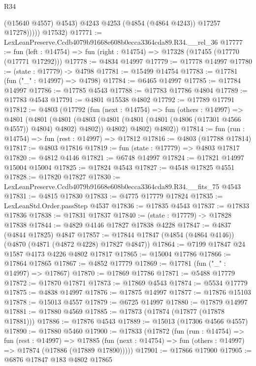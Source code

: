 \begin{lexlean}{R34}
\begin{coremodule}
                  (@15640 @4557)
                  @4543)
                @4243
                @4253
                (@4854 (@4864 @4243))
                @17257
                @17278)))))
      @17532)
@17771 := LexLeanPreserve.Ccdb4079b91668e608b0ecca3364cda89.R34.__rel_36
@17777 := fun (left : @14754) => fun (right : @14754) => @17328 (@17455 (@17770 (@17771 @17292)))
@17778 := @4834 @14997
@17779 := @17778 @14997
@17780 := (state : @17779) -> @4798
@17781 := @15499 @14754
@17783 := @17781 (fun ("_" : @14997) => @4798)
@17784 := @6465 @14997
@17785 := @17784 @14997
@17786 := @17785 @4543
@17788 := @17783 @17786 @4804
@17789 := @17783 @4543
@17791 := @4801 @15538 @4802
@17792 := @17789 @17791
@17812 := @4803
    (@17792
      (fun (next : @14754) =>
      fun (others : @14997) =>
      @4801
        (@4801
          (@4801
            (@4803 (@4801 (@4801 (@4801 (@4806 (@17301 @4566 @4557)) @4804) @4802) @4802))
            @4802)
          @4802)
        @4802))
@17814 := fun (run : @14754) => fun (rest : @14997) => @17812
@17816 := @4803 (@17788 @17814)
@17817 := @4803 @17816
@17819 := fun (state : @17779) => @4803 @17817
@17820 := @4812 @4146
@17821 := @6748 @14997
@17824 := @17821 @14997 @15004 @15004
@17825 := @17824 @4543
@17827 := @4548 @17825 @4551
@17828 := @17820 @17827
@17830 := LexLeanPreserve.Ccdb4079b91668e608b0ecca3364cda89.R34.__fits_75 @4543
@17831 := @4815 @17830
@17833 := @4775 @17779 @17824
@17835 := LexLeanStd.Order.passStep @4537
@17836 := @17835 @4543
@17837 := @17833 @17836
@17838 := @17831 @17837
@17840 := (state : @17779) -> @17828 @17838
@17844 := @4829 @4146 @17827 @17838 @4228
@17847 := @4837 (@4844 @17825) @4847
@17857 := @17844 @17847 (@4854 (@4864 @4146)) (@4870 (@4871 (@4872 @4228) @17827 @4847))
@17864 := @7199 @17847 @24 @1587 @4173 @4226 @4802 @17817
@17865 := @15004 @17786
@17866 := @17864 @17865
@17867 := @4852 @17779
@17869 := @17781 (fun ("_" : @14997) => @17867)
@17870 := @17869 @17786
@17871 := @5488 @17779
@17872 := @17870 @17871
@17873 := @17869 @4543
@17874 := @5534 @17779
@17875 := @4838 @14997
@17876 := @17875 @14997
@17877 := @17876 @15103
@17878 := @15013 @4557
@17879 := @6725 @14997
@17880 := @17879 @14997
@17881 := @17880 @4569
@17885 := @17873 (@17874 (@17877 (@17878 @17881)))
@17886 := @17876 @4543
@17889 := @15013 (@17306 @4566 @4557)
@17890 := @17880 @5460
@17900 := @17833
    (@17872
      (fun (run : @14754) =>
      fun (rest : @14997) =>
      @17885 (fun (next : @14754) => fun (others : @14997) => @17874 (@17886 (@17889 @17890)))))
@17901 := @17866 @17900
@17905 := @6876 @17847 @183 @4802 @17865

\end{coremodule}
\end{lexlean}
